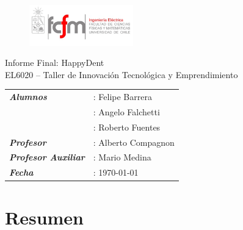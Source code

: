 \documentclass[letterpaper,12pt]{article}
\begin{document}
 
 \begin{titlepage}
	\begin{figure}[h!]
		\includegraphics[width=0.4\textwidth]{fcfm}
		\vspace{0.75cm} 
	\end{figure}
        \hspace*{2.3cm} 

        \bigskip

        \vspace*{4 cm}
        \begin{center}
            \huge{Informe Final: HappyDent}\\
	\large{EL6020 – Taller de Innovación Tecnológica y Emprendimiento}
        \end{center}
        \vspace*{3 in}
        \begin{flushright}
            \begin{tabular}{ll}
		
                \textbf{\textit{Alumnos}} &: Felipe Barrera\\
					&: Angelo Falchetti\\
					&: Roberto Fuentes\\
		\textbf{\textit{Profesor}} &: Alberto Compagnon \\
		\textbf{\textit{Profesor Auxiliar}} &: Mario Medina \\
                \textbf{\textit{Fecha}} &: \today \\
            \end{tabular}
        \end{flushright}
    \end{titlepage}

\newpage
 
\section{Resumen}
\end{document}

